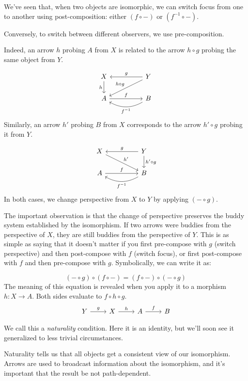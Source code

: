 \documentclass[DaoFP]{subfiles}
\begin{document}
We've seen that, when two objects are isomorphic, we can switch focus from one to another using post-composition: either $(f \circ -)$ or $(f^{-1} \circ -)$. 

Conversely, to switch between different observers, we use pre-composition. 

Indeed, an arrow $h$ probing $A$ from $X$ is related to the arrow $h\circ g$ probing the same object from $Y$.

\[
 \begin{tikzcd}
 X
 \arrow[d, "h"']
 && Y
 \arrow[ll, "g"']
  \arrow[dll, "h \circ g"']
 \\
 A
 \arrow[rr, "f"]
  && B
 \arrow[ll, bend left,  "f^{-1}"]
 \end{tikzcd}
\]
Similarly, an arrow $h'$ probing $B$ from $X$ corresponds to the arrow $h' \circ g$ probing it from $Y$. 

\[
 \begin{tikzcd}
 X
 \arrow[drr, "h'"]
 && Y
 \arrow[ll, "g"']
  \arrow[d, "h' \circ g"]
 \\
 A
 \arrow[rr, "f"]
  && B
 \arrow[ll, bend left,  "f^{-1}"]
 \end{tikzcd}
\]
In both cases, we change perspective from $X$ to $Y$ by applying $(- \circ g)$.

The important observation is that the change of perspective preserves the buddy system established by the isomorphism. If two arrows were buddies from the perspective of $X$, they are still buddies from the perspective of $Y$. This is as simple as saying that it doesn't matter if you first pre-compose with $g$ (switch perspective) and then post-compose with $f$ (switch focus), or first post-compose with $f$ and then pre-compose with $g$. Symbolically, we can write it as:

\[(- \circ g) \circ (f \circ -) = (f \circ -) \circ (- \circ g)\]
The meaning of this equation is revealed when you apply it to a morphism $h \colon X \to A$. Both sides evaluate to $f \circ h \circ g$. 
\[
 \begin{tikzcd}
 Y \arrow[r, "g"] &X \arrow[r, "h"] & A \arrow[r, "f"] & B
\end{tikzcd}
\]


We call this a \emph{naturality} condition. Here it is an identity, but we'll soon see it generalized to less trivial circumstances.

Naturality tells us that all objects get a consistent view of our isomorphism. Arrows are used to broadcast information about the isomorphism, and it's important that the result be not path-dependent. 
\end{document}
